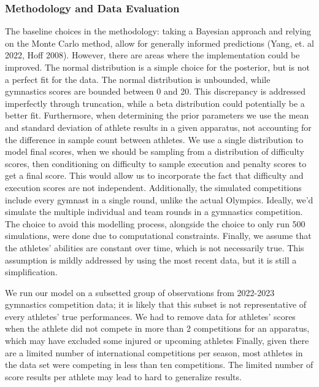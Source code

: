 \documentclass[
  10.5pt,
  letterpaper,
  DIV=11,
  numbers=noendperiod]{scrartcl}
\begin{document}
\hypertarget{methodology-and-data-evaluation}{%
\subsubsection{Methodology and Data
Evaluation}\label{methodology-and-data-evaluation}}

The baseline choices in the methodology: taking a Bayesian approach and
relying on the Monte Carlo method, allow for generally informed
predictions (Yang, et. al 2022, Hoff 2008). However, there are areas
where the implementation could be improved. The normal distribution is a
simple choice for the posterior, but is not a perfect fit for the data.
The normal distribution is unbounded, while gymnastics scores are
bounded between 0 and 20. This discrepancy is addressed imperfectly
through truncation, while a beta distribution could potentially be a
better fit. Furthermore, when determining the prior parameters we use
the mean and standard deviation of athlete results in a given apparatus,
not accounting for the difference in sample count between athletes. We
use a single distribution to model final scores, when we should be
sampling from a distribution of difficulty scores, then conditioning on
difficulty to sample execution and penalty scores to get a final score.
This would allow us to incorporate the fact that difficulty and
execution scores are not independent. Additionally, the simulated
competitions include every gymnast in a single round, unlike the actual
Olympics. Ideally, we'd simulate the multiple individual and team rounds
in a gymnastics competition. The choice to avoid this modelling process,
alongside the choice to only run 500 simulations, were done due to
computational constraints. Finally, we assume that the athletes'
abilities are constant over time, which is not necessarily true. This
assumption is mildly addressed by using the most recent data, but it is
still a simplification.

We run our model on a subsetted group of observations from 2022-2023
gymnastics competition data; it is likely that this subset is not
representative of every athletes' true performances. We had to remove
data for athletes' scores when the athlete did not compete in more than
2 competitions for an apparatus, which may have excluded some injured or
upcoming athletes Finally, given there are a limited number of
international competitions per season, most athletes in the data set
were competing in less than ten competitions. The limited number of
score results per athlete may lead to hard to generalize results.
\end{document}
